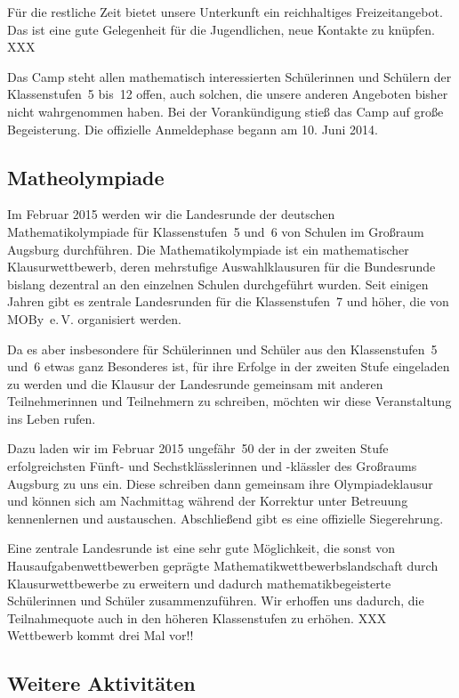 \documentclass[12pt]{zettel}
\begin{document}
Für die restliche Zeit bietet unsere Unterkunft ein reichhaltiges
Freizeitangebot. Das ist eine gute Gelegenheit für die Jugendlichen, neue
Kontakte zu knüpfen. XXX

Das Camp steht allen mathematisch interessierten Schülerinnen und Schülern der
Klassenstufen~5 bis~12 offen, auch solchen, die unsere anderen Angeboten bisher
nicht wahrgenommen haben. Bei der Vorankündigung stieß das Camp auf große
Begeisterung. Die offizielle Anmeldephase begann am 10. Juni 2014.


\subsection{Matheolympiade}

Im Februar 2015 werden wir die Landesrunde der deutschen
Mathematikolympiade für Klassenstufen~5 und~6 von Schulen im Großraum
Augsburg durchführen. Die Mathematikolympiade ist ein mathematischer
Klausurwettbewerb, deren mehrstufige Auswahlklausuren für die Bundesrunde
bislang dezentral an den einzelnen Schulen durchgeführt wurden. Seit einigen
Jahren gibt es zentrale Landesrunden für die Klassenstufen~7 und höher, die von
MOBy~e.\,V. organisiert werden.

Da es aber insbesondere für Schülerinnen und Schüler aus den Klassenstufen~5
und~6 etwas ganz Besonderes ist, für ihre Erfolge in der zweiten Stufe
eingeladen zu werden und die Klausur der Landesrunde gemeinsam mit anderen
Teilnehmerinnen und Teilnehmern zu schreiben, möchten wir diese Veranstaltung
ins Leben rufen.

Dazu laden wir im Februar 2015 ungefähr~50 der in der zweiten Stufe
erfolgreichsten Fünft- und Sechstklässlerinnen und -klässler des Großraums
Augsburg zu uns ein. Diese schreiben dann gemeinsam ihre Olympiadeklausur und
können sich am Nachmittag während der Korrektur unter Betreuung kennenlernen
und austauschen. Abschließend gibt es eine offizielle Siegerehrung.

Eine zentrale Landesrunde ist eine sehr gute Möglichkeit, die sonst von
Hausaufgabenwettbewerben geprägte Mathematikwettbewerbslandschaft durch
Klausurwettbewerbe zu erweitern und dadurch mathematikbegeisterte Schülerinnen
und Schüler zusammenzuführen. Wir erhoffen uns dadurch, die Teilnahmequote auch
in den höheren Klassenstufen zu erhöhen. XXX Wettbewerb kommt drei Mal vor!!


\subsection{Weitere Aktivitäten}
\end{document}
